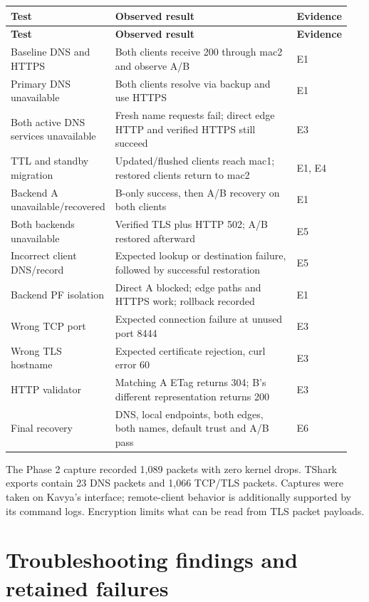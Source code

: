 \documentclass[12pt,a4paper]{article}
\newcommand{\tablehead}{\rowcolor{Pale}}
\begin{document}
\begingroup\small
\begin{longtable}{@{}>{\raggedright\arraybackslash}p{0.25\linewidth}>{\raggedright\arraybackslash}p{0.56\linewidth}>{\raggedright\arraybackslash}p{0.14\linewidth}@{}}
\toprule
\tablehead \textbf{Test} & \textbf{Observed result} & \textbf{Evidence}\\\midrule
\endfirsthead
\toprule
\tablehead \textbf{Test} & \textbf{Observed result} & \textbf{Evidence}\\\midrule
\endhead
Baseline DNS and HTTPS & Both clients receive 200 through mac2 and observe A/B & E1\\
Primary DNS unavailable & Both clients resolve via backup and use HTTPS & E1\\
Both active DNS services unavailable & Fresh name requests fail; direct edge HTTP and verified HTTPS still succeed & E3\\
TTL and standby migration & Updated/flushed clients reach mac1; restored clients return to mac2 & E1, E4\\
Backend A unavailable/recovered & B-only success, then A/B recovery on both clients & E1\\
Both backends unavailable & Verified TLS plus HTTP 502; A/B restored afterward & E5\\
Incorrect client DNS/record & Expected lookup or destination failure, followed by successful restoration & E5\\
Backend PF isolation & Direct A blocked; edge paths and HTTPS work; rollback recorded & E1\\
Wrong TCP port & Expected connection failure at unused port 8444 & E3\\
Wrong TLS hostname & Expected certificate rejection, curl error 60 & E3\\
HTTP validator & Matching A ETag returns 304; B's different representation returns 200 & E3\\
Final recovery & DNS, local endpoints, both edges, both names, default trust and A/B pass & E6\\
\bottomrule
\end{longtable}
\endgroup

The Phase 2 capture recorded 1,089 packets with zero kernel drops. TShark exports contain 23 DNS packets and 1,066 TCP/TLS packets. Captures were taken on Kavya's interface; remote-client behavior is additionally supported by its command logs. Encryption limits what can be read from TLS packet payloads.


\section{Troubleshooting findings and retained failures}
\end{document}
